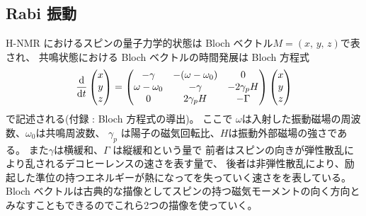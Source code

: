 \documentclass[11pt,dvipdfmx,a4paper]{jsarticle}
\begin{document}
\subsection{Rabi 振動}
H-NMR におけるスピンの量子力学的状態は Bloch ベクトル\(M = (x,\,y,\,z)\)で表され、
共鳴状態における Bloch ベクトルの時間発展は Bloch 方程式
\begin{equation}
	\dv{t}
	\begin{pmatrix}
		x\\ y\\ z
	\end{pmatrix}
	=
	\begin{pmatrix}
		-\gamma & -(\omega-\omega_0) & 0\\
		\omega -\omega_0 & -\gamma & -2\gamma_p H\\
		0 & 2\gamma_p H & -\Gamma
	\end{pmatrix}
	\begin{pmatrix}
		x\\ y\\ z
	\end{pmatrix}
\end{equation}
で記述される(付録 : Bloch 方程式の導出)。
ここで
\(\omega\)は入射した振動磁場の周波数、\(\omega_0\)は共鳴周波数、
\(\gamma_p\) は陽子の磁気回転比、\(H\)は振動外部磁場の強さである。
また\(\gamma\)は横緩和、\(\Gamma\) は縦緩和という量で
前者はスピンの向きが弾性散乱により乱されるデコヒーレンスの速さを表す量で、
後者は非弾性散乱により、励起した準位の持つエネルギーが熱になってを失っていく速さをを表している。 %
Bloch ベクトルは古典的な描像としてスピンの持つ磁気モーメントの向く方向とみなすこともできるのでこれら2つの描像を使っていく。
\end{document}
